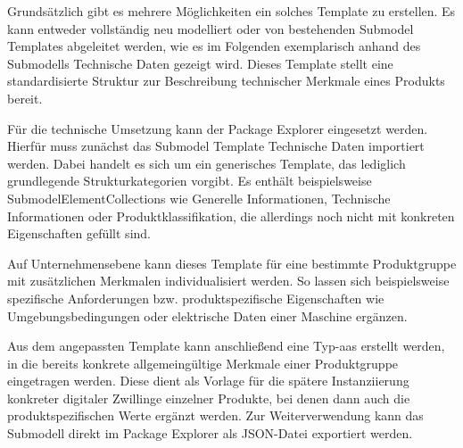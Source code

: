Grundsätzlich gibt es mehrere Möglichkeiten ein solches Template zu erstellen.
Es kann entweder vollständig neu modelliert oder von bestehenden Submodel Templates abgeleitet werden, wie es im Folgenden exemplarisch anhand des Submodells Technische Daten \cite{SpezifikaitonTechnischeDaten} gezeigt wird.
Dieses Template stellt eine standardisierte Struktur zur Beschreibung technischer Merkmale eines Produkts bereit.

Für die technische Umsetzung kann der Package Explorer eingesetzt werden.
Hierfür muss zunächst das Submodel Template Technische Daten importiert werden.
Dabei handelt es sich um ein generisches Template, das lediglich grundlegende Strukturkategorien vorgibt.
Es enthält beispielsweise SubmodelElementCollections wie Generelle Informationen, Technische Informationen oder Produktklassifikation, die allerdings noch nicht mit konkreten Eigenschaften gefüllt sind.

Auf Unternehmensebene kann dieses Template für eine bestimmte Produktgruppe mit zusätzlichen Merkmalen individualisiert werden.
So lassen sich beispielsweise spezifische Anforderungen bzw. produktspezifische Eigenschaften wie Umgebungsbedingungen oder elektrische Daten einer Maschine ergänzen.

Aus dem angepassten Template kann anschließend eine Typ-\acs{aas} erstellt werden, in die bereits konkrete allgemeingültige Merkmale einer Produktgruppe eingetragen werden.
Diese dient als Vorlage für die spätere Instanziierung konkreter digitaler Zwillinge einzelner Produkte, bei denen dann auch die produktspezifischen Werte ergänzt werden.
Zur Weiterverwendung kann das Submodell direkt im Package Explorer als JSON-Datei exportiert werden.





